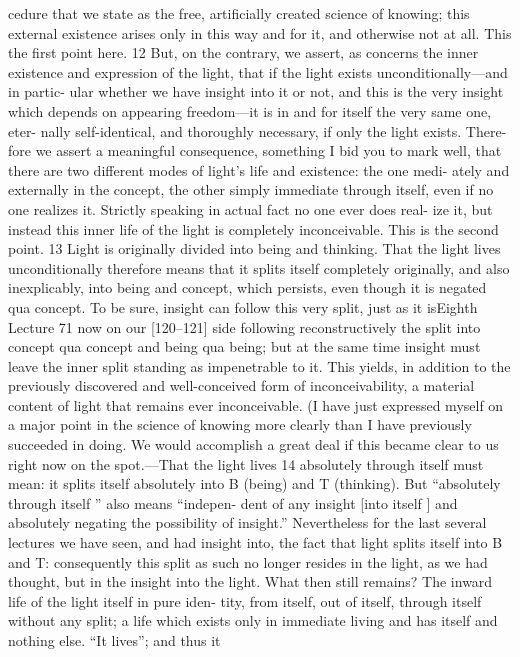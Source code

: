 cedure that we state as the free, artificially created science of knowing; this
external existence arises only in this way and for it, and otherwise not at all. This
the first point here. 12
But, on the contrary, we assert, as concerns the inner existence and
expression of the light, that if the light exists unconditionally—and in partic-
ular whether we have insight into it or not, and this is the very insight which
depends on appearing freedom—it is in and for itself the very same one, eter-
nally self-identical, and thoroughly necessary, if only the light exists. There-
fore we assert a meaningful consequence, something I bid you to mark well,
that there are two different modes of light’s life and existence: the one medi-
ately and externally in the concept, the other simply immediate through itself,
even if no one realizes it. Strictly speaking in actual fact no one ever does real-
ize it, but instead this inner life of the light is completely inconceivable. This is
the second point. 13
Light is originally divided into being and thinking. That the light lives
unconditionally therefore means that it splits itself completely originally, and
also inexplicably, into being and concept, which persists, even though it is
negated qua concept. To be sure, insight can follow this very split, just as it isEighth Lecture
71
now on our [120–121] side following reconstructively the split into concept qua
concept and being qua being; but at the same time insight must leave the inner
split standing as impenetrable to it. This yields, in addition to the previously
discovered and well-conceived form of inconceivability, a material content of
light that remains ever inconceivable.
(I have just expressed myself on a major point in the science of knowing
more clearly than I have previously succeeded in doing. We would accomplish
a great deal if this became clear to us right now on the spot.—That the light
lives 14 absolutely through itself must mean: it splits itself absolutely into B
(being) and T (thinking). But “absolutely through itself ” also means “indepen-
dent of any insight [into itself ] and absolutely negating the possibility of
insight.” Nevertheless for the last several lectures we have seen, and had insight
into, the fact that light splits itself into B and T: consequently this split as such
no longer resides in the light, as we had thought, but in the insight into the
light. What then still remains? The inward life of the light itself in pure iden-
tity, from itself, out of itself, through itself without any split; a life which exists
only in immediate living and has itself and nothing else. “It lives”; and thus it
